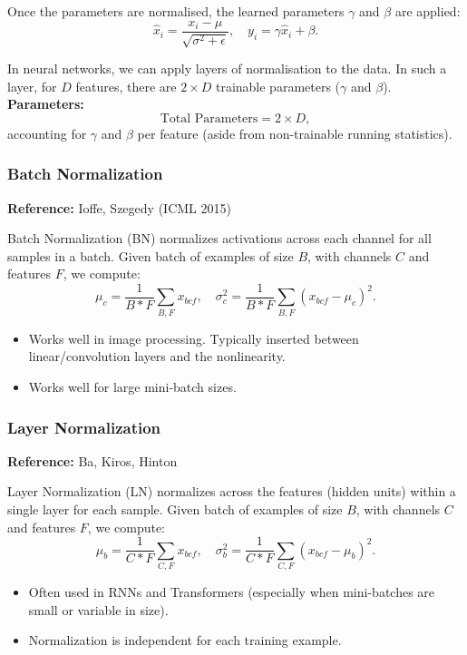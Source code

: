 \documentclass{article}
\begin{document}
Once the parameters are normalised, the learned parameters \(\gamma\) and \(\beta\) are applied:
\[
\hat{x}_i = \frac{x_i - \mu}{\sqrt{\sigma^2 + \epsilon}},\quad y_i = \gamma \hat{x}_i + \beta.
\]

In neural networks, we can apply layers of normalisation to the data. In such a layer, for \(D\) features, there are \(2 \times D\) trainable parameters (\(\gamma\) and \(\beta\)).
\textbf{Parameters:}
\[
\text{Total Parameters} = 2 \times D,
\]
accounting for $\gamma$ and $\beta$ per feature (aside from non-trainable running statistics).

\subsubsection{Batch Normalization}
\label{sec:batchnorm}

\textbf{Reference:} Ioffe, Szegedy (ICML 2015)

Batch Normalization (BN) normalizes activations across each channel for all samples in a batch.  
Given batch of examples of size $B$, with channels $C$ and features $F$, we compute:
\[
\mu_c = \frac{1}{B*F} \sum_{B,F} x_{bcf}, 
\quad
\sigma^2_c = \frac{1}{B*F} \sum_{B,F} (x_{bcf} - \mu_c)^2.
\]

\begin{itemize}
    \item Works well in image processing. Typically inserted between linear/convolution layers and the nonlinearity.
    \item Works well for large mini-batch sizes.
\end{itemize}

\subsubsection{Layer Normalization}
\label{sec:layernorm}

\textbf{Reference:} Ba, Kiros, Hinton

Layer Normalization (LN) normalizes across the features (hidden units) within a single layer for each sample. Given batch of examples of size $B$, with channels $C$ and features $F$, we compute:
\[
\mu_b = \frac{1}{C*F} \sum_{C,F} x_{bcf}, 
\quad
\sigma^2_b = \frac{1}{C*F} \sum_{C,F} (x_{bcf} - \mu_b)^2.
\]

\begin{itemize}
    \item Often used in RNNs and Transformers (especially when mini-batches are small or variable in size).
    \item Normalization is independent for each training example.
\end{itemize}
\end{document}

